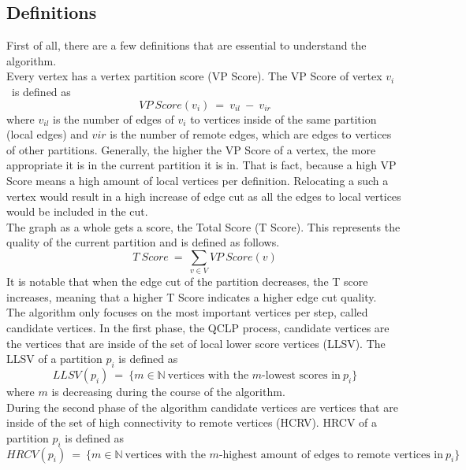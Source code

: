 \documentclass[acmsmall,nonacm,screen,review]{acmart}
\begin{document}
\subsection{Definitions} %
First of all, there are a few definitions that are essential to understand the algorithm. \\
Every vertex has a vertex partition score (VP Score). The VP Score of vertex $v_{i}$ \ is defined as \[VP\ Score(v_{i})\ =\ v_{il}\ -\ v_{ir}\] where $v_{il}$ is the number of edges of $v_{i}$ to vertices inside of the same partition (local edges) and $v{ir}$ is the number of remote edges, which are edges to vertices of other partitions. Generally, the higher the VP Score of a vertex, the more appropriate it is in the current partition it is in. That is fact, because a high VP Score means a high amount of local vertices per definition. Relocating a such a vertex would result in a high increase of edge cut as all the edges to local vertices would be included in the cut.\\
The graph as a whole gets a score, the Total Score (T Score). This represents the quality of the current partition and is defined as follows. \[T\ Score\ =\ \sum_{v\in V} VP\ Score(v)  \]
It is notable that when the edge cut of the partition decreases, the T score increases, meaning that a higher T Score indicates a higher edge cut quality.\\
The algorithm only focuses on the most important vertices per step, called candidate vertices. In the first phase, the QCLP process, candidate vertices are the vertices that are inside of the set of local lower score vertices (LLSV). The LLSV of a partition $p_{i}$ is defined as \[LLSV(p_{i})\ =\ \{ m\in \mathbb{N}\ \text{vertices with the }m\text{-lowest scores in}\ p_{i}\}\] where $m$ is decreasing during the course of the algorithm. \\
During the second phase of the algorithm candidate vertices are vertices that are inside of the set of high connectivity to remote vertices (HCRV). HRCV of a partition $p_{i}$ is defined as 
\[HRCV(p_{i})\ =\ \{m\in \mathbb{N}\ \text{vertices with the }m\text{-highest amount of edges to remote vertices in}\ p_{i}\} \]
\end{document}
